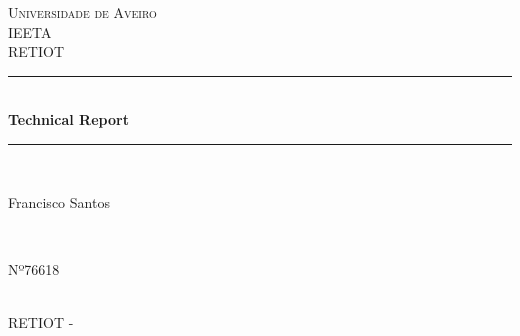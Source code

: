 \documentclass[12pt]{article}
\begin{document}
\begin{titlepage}


\newcommand{\HRule}{\rule{\linewidth}{0.5mm}} %

\center %
 

\textsc{\LARGE Universidade de Aveiro}\\[1.5cm] %
\textsc{\Large IEETA}\\[0.5cm] %
\textsc{\Large RETIOT}\\[0.5cm]


\HRule \\[0.4cm]
{ \huge \bfseries Technical Report}\\[0.4cm] %
\HRule \\[1.5cm]
 

\begin{minipage}{0.4\textwidth}
\begin{flushleft} \large
Francisco Santos %
\end{flushleft}
\end{minipage}
~
\begin{minipage}{0.4\textwidth}
\begin{flushright} \large
Nº76618\\
\end{flushright}
\end{minipage}\\[2cm]

\Large {RETIOT -}



\end{titlepage}
\end{document}
